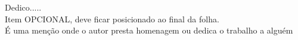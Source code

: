 
\vspace*{20cm}
\hspace{0.4\textwidth}
\begin{varwidth}{0.48\textwidth}
  \leading{5mm}
  Dedico.....\\
  Item OPCIONAL, deve ficar posicionado ao final da folha.\\
  É uma menção onde o autor presta \mbox{homenagem} ou dedica o trabalho a
  alguém
\end{varwidth}
